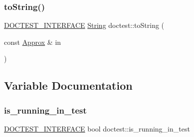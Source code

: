 \mbox{\label{namespacedoctest_a63aa06a8555c5aa34a7a6e76e87a3bca}} 
\subsubsection{\texorpdfstring{to\+String()}{toString()}\hspace{0.1cm}{\footnotesize\ttfamily [18/18]}}
{\footnotesize\ttfamily \hyperlink{doctest_8h_a9c16ffc635ec47f07797d21ede26b1a5}{D\+O\+C\+T\+E\+S\+T\+\_\+\+I\+N\+T\+E\+R\+F\+A\+CE} \hyperlink{classdoctest_1_1String}{String} doctest\+::to\+String (\begin{DoxyParamCaption}\item[{const \hyperlink{classdoctest_1_1Approx}{Approx} \&}]{in }\end{DoxyParamCaption})}



\subsection{Variable Documentation}
\mbox{\label{namespacedoctest_a0b03060093b3894c976b6ae84e55f3f2}} 
\subsubsection{\texorpdfstring{is\+\_\+running\+\_\+in\+\_\+test}{is\_running\_in\_test}}
{\footnotesize\ttfamily \hyperlink{doctest_8h_a9c16ffc635ec47f07797d21ede26b1a5}{D\+O\+C\+T\+E\+S\+T\+\_\+\+I\+N\+T\+E\+R\+F\+A\+CE} bool doctest\+::is\+\_\+running\+\_\+in\+\_\+test}

